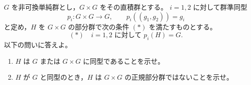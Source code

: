 \newcommand{\C}{\mathbb{C}}
\newcommand{\R}{\mathbb{R}}
\newcommand{\Z}{\mathbb{Z}}
\newcommand{\Tr}{\operatorname{Tr}}
\newcommand{\Impart}{\operatorname{Im}}
\newcommand{\AF}{\operatorname{AF}}
\newcommand{\AX}{\operatorname{AX}}
\newcommand{\GL}{\operatorname{GL}}


\(G\) を非可換単純群とし，\(G\times G\) をその直積群とする。
\(i=1,2\) に対して群準同型
\[
  p_i:G\times G\longrightarrow G,\qquad
  p_i((g_1,g_2))=g_i
\]
と定め，\(H\) を \(G\times G\) の部分群で次の条件 \((*)\) を満たすものとする。
\[
  (*)\quad i=1,2\text{ に対して }p_i(H)=G.
\]
以下の問いに答えよ。

\begin{enumerate}
  \item \(H\) は \(G\) または \(G\times G\) に同型であることを示せ。
  \item \(H\) が \(G\) と同型のとき，\(H\) は \(G\times G\) の正規部分群ではないことを示せ。
\end{enumerate}

%